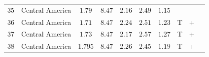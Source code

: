 \documentclass[12pt]{article}
\begin{document}
{\begin{table}[H]
{\begin{tabular}{ c c c c c c c c c c}
         35 &   Central America   & $1.79$ & $8.47$ & $2.16$ & $2.49$ & $1.15$  \\      
         36 &   Central America  &  $1.71$ & $8.47$ & $2.24$ & $2.51$ & $1.23$ &T & + \\     
         37 &   Central America  & $1.73$ & $8.47$ & $2.17$ & $2.57$ & $1.27$ & T & +\\                       
          38 &  Central America   & $1.795$ & $8.47$ & $2.26$ & $2.45$ & $1.19$ &T & +\\              
   	\hline %
		\end{tabular}
        }
		\label{table:force_balance} %
\end{table}







}
\end{document}
